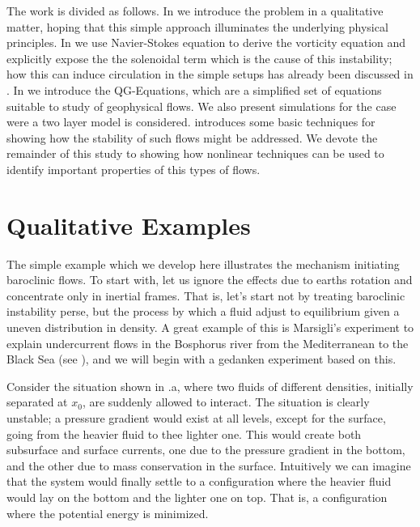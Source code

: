 The work is divided as follows. In  we introduce the
problem in a qualitative matter, hoping that this simple approach
illuminates the underlying physical principles. In 
we use Navier-Stokes equation to derive the vorticity equation and
explicitly expose the the solenoidal term which is the cause of this
instability; how this can induce circulation in the simple setups has
already been discussed in . In  we
introduce the QG-Equations, which are a simplified set of equations
suitable to study of geophysical flows. We also present simulations for
the case were a two layer model is considered.  
introduces some basic techniques for showing how the stability of such
flows might be addressed. We devote the remainder of this study to
showing how nonlinear techniques can be used to identify important
properties of this types of flows.

\section{Qualitative Examples}
\label{s:examples}

The simple example which we develop here illustrates the mechanism
initiating baroclinic flows. To start with, let us ignore the effects due
to earths rotation and concentrate only in inertial frames. That is,
let's start not by treating baroclinic instability perse, but the process
by which a fluid adjust to equilibrium given a uneven distribution in
density. A great example of this is Marsigli's experiment to explain
undercurrent flows in the Bosphorus river from the Mediterranean to the
Black Sea (see ), and we will begin with a gedanken
experiment based on this.

Consider the situation shown in .a, where two fluids
of different densities, initially separated at $x_0$, are suddenly
allowed to interact. The situation is clearly unstable; a pressure
gradient would exist at all levels, except for the surface, going from
the heavier fluid to thee lighter one. This would create both subsurface
and surface currents, one due to the pressure gradient in the bottom, and
the other due to mass conservation in the surface. Intuitively we can
imagine that the system would finally settle to a configuration where the
heavier fluid would lay on the bottom and the lighter one on top. That
is, a configuration where the potential energy is minimized.

